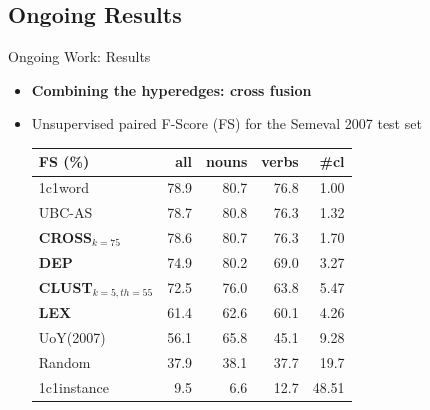 \documentclass[10pt,xcolor=table]{beamer}
\begin{document}
\subsection{Ongoing Results}


\begin{frame}{Ongoing Work: Results}
\begin{itemize}
	\item \textbf{Combining the hyperedges: cross fusion}
	
		\item[] Unsupervised paired F-Score (FS) for the Semeval 2007 test set
		\centering
\begin{tabular}{@{}lrrrr@{}}
\toprule
\textbf{FS (\%)} & \textbf{all} & \textbf{nouns} & \textbf{verbs} & \textbf{\#cl} \\ \midrule
1c1word          & 78.9         & 80.7           & 76.8           & 1.00             \\
UBC-AS           & 78.7         & 80.8           & 76.3           & 1.32          \\
\textbf{CROSS$_{k=75}$}     & 78.6         & 80.7           & 76.3           & 1.70          \\
\textbf{DEP}     & 74.9         & 80.2           & 69.0           & 3.27          \\
\textbf{CLUST$_{k=5,th=55	}$}    & 72.5          & 76.0           & 63.8  & 5.47          \\
\textbf{LEX}     & 61.4         & 62.6           & 60.1           & 4.26         \\
UoY(2007)        & 56.1         & 65.8           & 45.1           & 9.28          \\
Random           & 37.9         & 38.1           & 37.7           & 19.7             \\
1c1instance & 	9.5         & 6.6           & 12.7           & 48.51             \\ \bottomrule
\end{tabular}

			
		
\end{itemize}


\end{frame}
\end{document}
